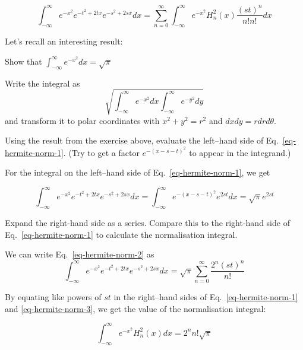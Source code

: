 \begin{equation}
\int_{-\infty}^{\infty} e^{-x^2} e^{-t^2 + 2tx} e^{-s^2 + 2sx} dx= \sum_{n = 0}^{\infty} \int_{-\infty}^{\infty} e^{-x^2} H_n^2(x)\frac{(st)^n}{n!n!} dx \label{eq-hermite-norm-1}
\end{equation}

Let's recall an interesting result:
\begin{exer}
Show that $\int_{-\infty}^{\infty}e^{-x^2}dx = \sqrt{\pi}$
\begin{hnt}
Write the integral as
$$\sqrt{\int_{-\infty}^{\infty} e^{-x^2}dx\int_{-\infty}^{\infty} e^{-y^2}dy}$$
and transform it to polar coordinates with $x^2+y^2=r^2$ and $dxdy = r dr d\theta$.
\end{hnt}
\end{exer}

\begin{cue}
Using the result from the exercise above, evaluate the left--hand side of Eq.~\ref{eq-hermite-norm-1}. (Try to get a factor $e^{-(x-s-t)^2}$ to appear in the integrand.)
\end{cue}

For the integral on the left--hand side of Eq.~\ref{eq-hermite-norm-1}, we get 

\begin{equation}
\int_{-\infty}^{\infty} e^{-x^2} e^{-t^2 + 2tx} e^{-s^2 + 2sx} dx 
  =  \int_{-\infty}^{\infty} e^{-(x-s-t)^2} e^{2st}dx = \sqrt{\pi} e^{2st}
  \label{eq-hermite-norm-2} 
\end{equation} 

\begin{cue}
Expand the right-hand side as a series. Compare this to the right-hand side of Eq.~\ref{eq-hermite-norm-1} to calculate the normalisation integral.
\end{cue}

We can write Eq.~\ref{eq-hermite-norm-2} as
\begin{equation}
  \int_{-\infty}^{\infty} e^{-x^2} e^{-t^2 + 2tx} e^{-s^2 + 2sx} dx 
    =  \sqrt{\pi} \sum_{n = 0}^{\infty} \frac{2^n{(st)}^n}{n!}  \label{eq-hermite-norm-3}
\end{equation} 
  
By equating like powers of $st$ in the right--hand sides of Eq.~\ref{eq-hermite-norm-1} and \ref{eq-hermite-norm-3}, we get the value of the normalisation integral:

\begin{equation}
\int_{-\infty}^{\infty} e^{-x^2} H_n^2(x) dx = 2^n n! \sqrt{\pi}
\end{equation} 

